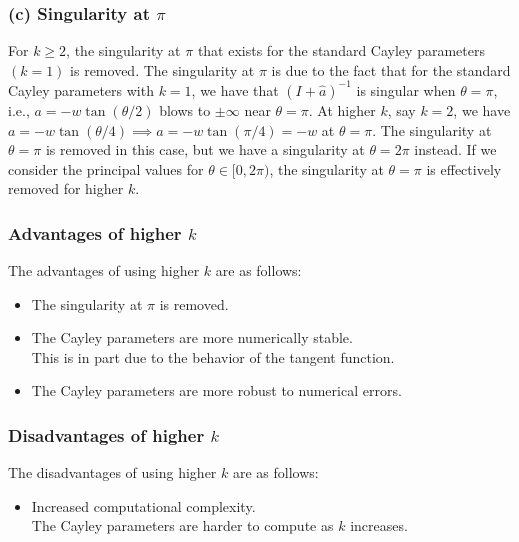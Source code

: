 \subsubsection*{(c) Singularity at \( \pi \)}

For \( k \geq 2 \), the singularity at \( \pi \) that exists for the standard Cayley parameters \( (k=1) \) is removed.
The singularity at \( \pi \) is due to the fact that for the standard Cayley parameters with \( k = 1 \), we have that \( {(I + \widehat{a})}^{-1} \) is singular when \( \theta = \pi \), i.e., \( a = -w \tan (\theta/2) \) blows to \( \pm \infty \) near \( \theta = \pi \).
At higher \( k \), say \( k = 2 \), we have \( a = -w \tan (\theta/4) \implies a = -w \tan (\pi/4) = -w \) at \( \theta = \pi \).
The singularity at \( \theta = \pi \) is removed in this case, but we have a singularity at \( \theta = 2\pi \) instead.
If we consider the principal values for \( \theta \in [0, 2\pi) \), the singularity at \( \theta = \pi \) is effectively removed for higher \( k \).

\subsubsection*{Advantages of higher \( k \)}

The advantages of using higher \( k \) are as follows:
\begin{itemize}[noitemsep]
    \item The singularity at \( \pi \) is removed.
    \item The Cayley parameters are more numerically stable. \\
          This is in part due to the behavior of the tangent function.
    \item The Cayley parameters are more robust to numerical errors.
\end{itemize}

\subsubsection*{Disadvantages of higher \( k \)}

The disadvantages of using higher \( k \) are as follows:
\begin{itemize}[noitemsep]
    \item Increased computational complexity. \\
          The Cayley parameters are harder to compute as \( k \) increases.
\end{itemize}

